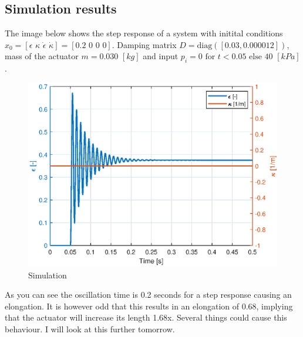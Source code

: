 \subsection{Simulation results}

The image below shows the step response of a system with initital conditions $x_0 = [\epsilon \hspace{4pt} \kappa \hspace{4pt} \dot{\epsilon} \hspace{4pt} \dot{\kappa}] =  [0.2 \hspace{4pt} 0 \hspace{4pt} 0 \hspace{4pt} 0]$. Damping matrix $D = \text{diag}([0.03,0.000012])$, mass of the actuator $m = 0.030\hspace{4pt}  [kg]$ and input $p_i = 0 \hspace{4pt} \text{for} \hspace{4pt} t  < 0.05 \hspace{4pt}  \text{else} \hspace{4pt} 40 \hspace{4pt}  [kPa]$ .

\begin{figure}[H]
    \centering
    \includegraphics{Figures/ProgresFigures/sim1.eps}
    \caption{Simulation}
    \label{fig:my_label}
\end{figure}

As you can see the oscillation time is 0.2 seconds for a step response causing an elongation. It is however odd that this results in an elongation of 0.68, implying that the actuator will increase its length 1.68x. Several things could cause this behaviour. I will look at this further tomorrow.